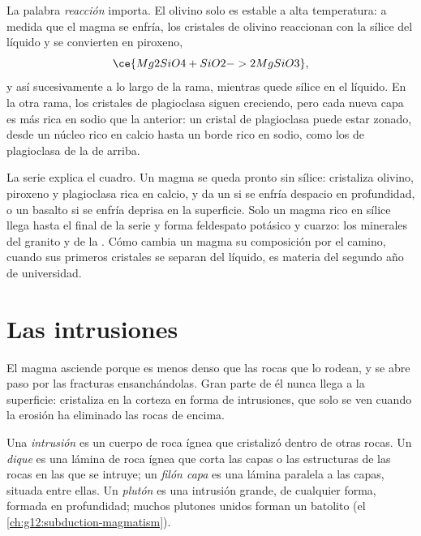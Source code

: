 La palabra \emph{reacción} importa. El olivino solo es estable a alta
temperatura: a medida que el magma se enfría, los cristales de olivino
reaccionan con la sílice del líquido y se convierten en piroxeno,
\[
  \ce{Mg2SiO4 + SiO2 -> 2 MgSiO3},
\]
y así sucesivamente a lo largo de la rama, mientras quede sílice en el
líquido. En la otra rama, los cristales de plagioclasa siguen creciendo, pero
cada nueva capa es más rica en sodio que la anterior: un cristal de
plagioclasa puede estar zonado, desde un núcleo rico en calcio hasta un borde
rico en sodio, como los  de plagioclasa de la  de arriba.

La serie explica el cuadro. Un magma  se queda pronto sin sílice:
cristaliza olivino, piroxeno y plagioclasa rica en calcio, y da un  si
se enfría despacio en profundidad, o un basalto si se enfría deprisa en la
superficie. Solo un magma rico en sílice llega hasta el final de la serie y
forma feldespato potásico y cuarzo: los minerales del granito y de la .
Cómo cambia un magma su composición por el camino, cuando sus primeros
cristales se separan del líquido, es materia del segundo año de universidad.

\section{Las intrusiones}

El magma asciende porque es menos denso que las rocas que lo rodean, y se abre
paso por las fracturas ensanchándolas. Gran parte de él nunca llega a la
superficie: cristaliza en la corteza en forma de intrusiones, que solo se ven
cuando la erosión ha eliminado las rocas de encima.

\begin{definition}\label{def:g11:igneous-rocks:intrusion}
Una \emph{intrusión} es un cuerpo de roca ígnea que cristalizó
dentro de otras rocas. Un \emph{dique} es una lámina de roca
ígnea que corta las capas o las estructuras de las rocas en las que se
intruye; un \emph{filón capa} es una lámina paralela a las
capas, situada entre ellas. Un \emph{plutón} es una intrusión
grande, de cualquier forma, formada en profundidad; muchos plutones unidos
forman un batolito (el \cref{ch:g12:subduction-magmatism}).
\end{definition}

